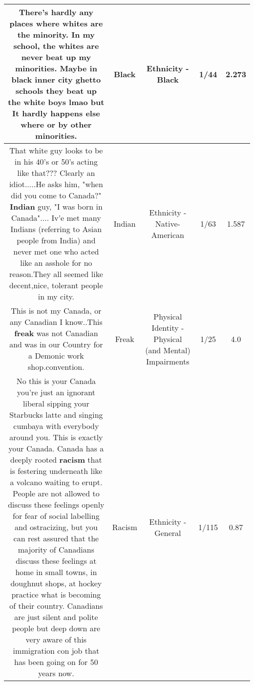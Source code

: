 \documentclass[11pt]{article}
\newlength\mylength
\begin{document}
\begin{center}
\begin{longtable}{|C{.65\mylength}|C{.30\mylength}|C{.12\mylength}|C{.12\mylength}|C{.12\mylength}|}
  \small There's hardly any places where whites are the minority. In my school, the whites are never beat up my minorities. Maybe in \textbf{black} inner city ghetto schools they beat up the white boys lmao but It hardly happens else where or by other minorities.\normalsize   & Black & Ethnicity - Black & 1/44 & 2.273 \\  \hline
  \small That white guy looks to be in his 40's or 50's acting like that??? Clearly an idiot.....He asks him, "when did you come to Canada?"  \textbf{Indian} guy, "I was born in Canada".... Iv'e met many Indians (referring to Asian people from India) and never met one who acted like an asshole for no reason.They all seemed like decent,nice, tolerant people in my city.\normalsize   & Indian & Ethnicity - Native-American & 1/63 & 1.587 \\  \hline
  \small This is not my Canada, or any Canadian I know..This \textbf{freak} was not Canadian and was in our Country for a Demonic work shop.convention.\normalsize   & Freak & Physical Identity - Physical (and Mental) Impairments & 1/25 & 4.0 \\  \hline
  \small No this is your Canada you're just an ignorant liberal sipping your Starbucks latte and singing cumbaya with everybody around you. This is exactly your Canada. Canada has a deeply rooted \textbf{racism} that is festering underneath like a volcano waiting to erupt. People are not allowed to discuss these feelings openly for fear of social labelling and ostracizing, but you can rest assured that the majority of Canadians discuss these feelings at home in small towns, in doughnut shops, at hockey practice what is becoming of their country. Canadians are just silent and polite people but deep down are very aware of this immigration con job that has been going on for 50 years now.\normalsize   & Racism & Ethnicity - General & 1/115 & 0.87 \\  \hline

\end{longtable}
\end{center}
\end{document}
